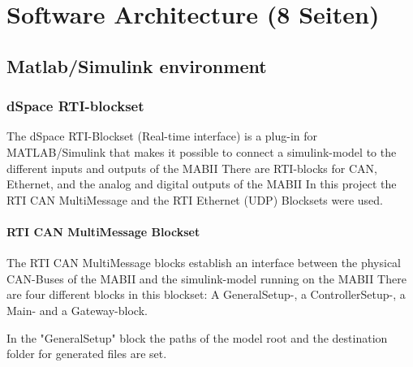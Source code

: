 \documentclass[ExampleMasters.tex]{subfiles}
\begin{document}
\clearpage
{\pagestyle{empty}\cleardoublepage}%


\chapter{Software Architecture (8 Seiten)}
\label{chap:software_setup}


\section{Matlab/Simulink environment}
\label{sec:matlab}




\subsection{dSpace RTI-blockset}

The dSpace RTI-Blockset (Real-time interface) is a plug-in for MATLAB/Simulink that makes it possible to connect a simulink-model to the different inputs and outputs of the \gls{MABII} There are \gls{RTI}-blocks for CAN, Ethernet, and the analog and digital outputs of the \gls{MABII}
In this project the \gls{RTI} \gls{CAN} MultiMessage and the \gls{RTI} Ethernet (UDP) Blocksets were used.\\ 
\subsubsection{RTI \gls{CAN} MultiMessage Blockset}
The \gls{RTI} \gls{CAN} MultiMessage blocks establish an interface between the physical \gls{CAN}-Buses of the \gls{MABII} and the simulink-model running on the \gls{MABII} There are four different blocks in this blockset: A GeneralSetup-, a ControllerSetup-, a Main- and a Gateway-block. 

In the "GeneralSetup" block the paths of the model root and the destination folder for generated files are set. 
\end{document}
